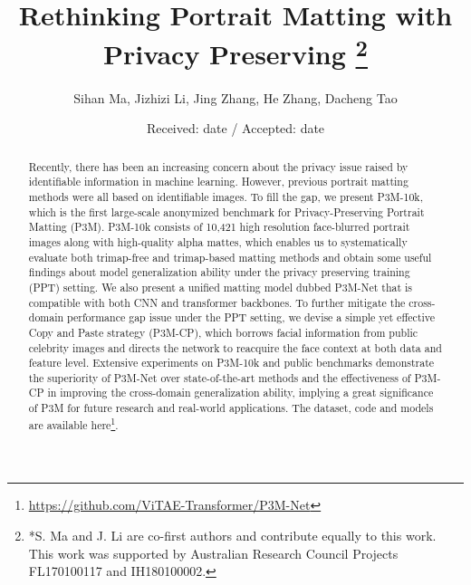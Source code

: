 \documentclass[twocolumn]{svjour3}
\begin{document}
\title{
Rethinking Portrait Matting with Privacy Preserving
\thanks{*S. Ma and J. Li are co-first authors and contribute equally to this work.\\
This work was supported by Australian Research Council Projects FL170100117 and IH180100002.}
}
\author{Sihan Ma,
        Jizhizi Li,
        Jing Zhang,
        He Zhang,
        Dacheng Tao
}


\date{Received: date / Accepted: date}


\maketitle

\begin{abstract}
Recently, there has been an increasing concern about the privacy issue raised by identifiable information in machine learning. However, previous portrait matting methods were all based on identifiable images. To fill the gap, we present P3M-10k, which is the first large-scale anonymized benchmark for Privacy-Preserving Portrait Matting (P3M). P3M-10k consists of 10,421 high resolution face-blurred portrait images along with high-quality alpha mattes, which enables us to systematically evaluate both trimap-free and trimap-based matting methods and obtain some useful findings about model generalization ability under the privacy preserving training (PPT) setting. We also present a unified matting model dubbed P3M-Net that is compatible with both CNN and transformer backbones. To further mitigate the cross-domain performance gap issue under the PPT setting, we devise a simple yet effective Copy and Paste strategy (P3M-CP), which borrows facial information from public celebrity images and directs the network to reacquire the face context at both data and feature level. Extensive experiments on P3M-10k and public benchmarks demonstrate the superiority of P3M-Net over state-of-the-art methods and the effectiveness of P3M-CP in improving the cross-domain generalization ability, implying a great significance of P3M for future research and real-world applications. The dataset, code and models are available here\footnote{\url{https://github.com/ViTAE-Transformer/P3M-Net}}.
\end{abstract}
\end{document}
